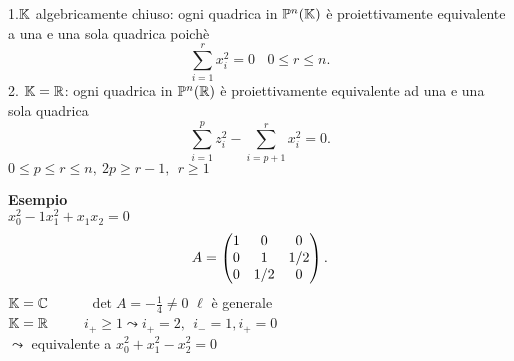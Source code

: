\documentclass[12px]{article}
\begin{document}
	\newpage
	 \begin{teo}
		1.$\mathbb{K}$ algebricamente chiuso: ogni quadrica in $\mathbb{P}^n(\mathbb{K})$ è proiettivamente equivalente a una e una sola quadrica poichè
		\[
		 \sum^r_{i=1}x_i^2=0 \ \ \ \ 0\leq r\leq n
		.\] 
		2. $\mathbb{K}=\mathbb{R}$: ogni quadrica in $\mathbb{P}^n(\mathbb{R})$ è proiettivamente equivalente ad una e una sola quadrica
		\[
		\sum^p_{i=1}z_i^2 - \sum^r_{i=p+1}x_i^2=0
		.\] 
		$0\leq p \leq r\leq n, \ 2p\geq r-1, \ \ r\geq 1$
	\end{teo}
	\textbf{Esempio}\\
	$x_0^2 -1 x_1^2 + x_1x_2=0$\\
	 \[
		 A=\begin{pmatrix}1&0&0\\0&1&1/2\\0&1/2&0\end{pmatrix}
	.\] 
	$\mathbb{K}=\mathbb{C}$ \ \ \ \ \ $\det A = -\frac 1 4\neq 0$ $\ell$ è generale\\
	$\mathbb{K} = \mathbb{R}$\ \ \ \ \  $i_+\geq 1 \leadsto i_+=2,\ \ i_-=1,i_+=0$\\
	 $\leadsto $ equivalente a $x_0^2+x_1^2-x_2^2=0$
		 
\end{document}
